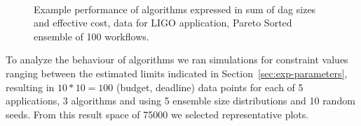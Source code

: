 \documentclass[conference]{IEEEtran}
\begin{document}
\begin{figure}[htb]
    \centering
    \\
    \caption{Example performance of algorithms expressed in
    sum of dag sizes and effective cost, data for LIGO application, Pareto
    Sorted ensemble of 100 workflows.}
    \label{fig:size-cost}
\end{figure}

To analyze the behaviour of algorithms we ran simulations for constraint values
ranging between the estimated limits indicated in Section~\ref{sec:exp-parameters},
resulting in $10 * 10 = 100$ (budget, deadline) data points for each of 5 applications, 3 algorithms and
using 5 ensemble size distributions and 10 random seeds. From this result space
of 75000 we selected representative plots.
\end{document}
